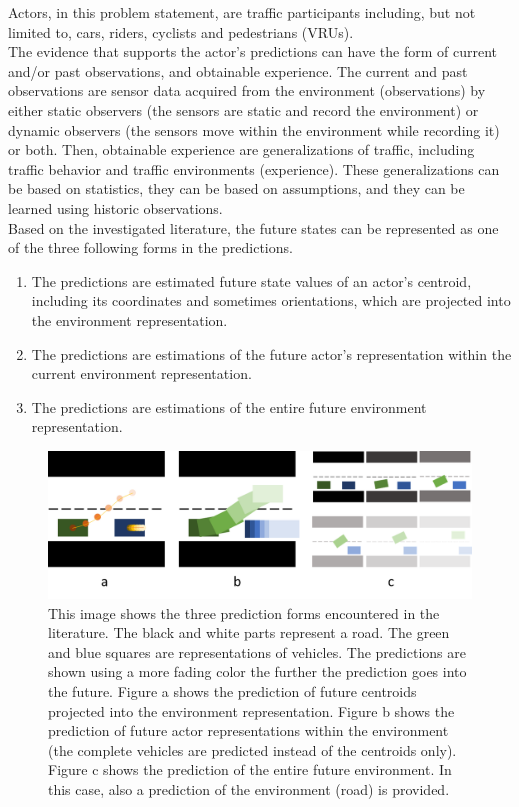 Actors, in this problem statement, are traffic participants including, but not limited to, cars, riders, cyclists and pedestrians (\glspl{VRU}). \\

The evidence that supports the actor's predictions can have the form of current and/or past observations, and obtainable experience. The current and past observations are sensor data acquired from the environment (observations) by either static observers (the sensors are static and record the environment) or dynamic observers (the sensors move within the environment while recording it) or both.
Then, obtainable experience are generalizations of traffic, including traffic behavior and traffic environments (experience). These generalizations can be based on statistics, they can be based on assumptions, and they can be learned using historic observations. \\

Based on the investigated literature, the future states can be represented as one of the three following forms in the predictions. 

\begin{enumerate}
	\item The predictions are estimated future state values of an actor's centroid, including its coordinates and sometimes orientations, which are projected into the environment representation.
	\item The predictions are estimations of the future actor's representation within the current environment representation.
	\item The predictions are estimations of the entire future environment representation.
\end{enumerate}

\begin{figure}[h!]
	\centering
	\includegraphics[width=0.8\linewidth]{Figures/Introduction/Prediction_forms}
	\caption{This image shows the three prediction forms encountered in the literature. The black and white parts represent a road. The green and blue squares are representations of vehicles. The predictions are shown using a more fading color the further the prediction goes into the future. Figure a shows the prediction of future centroids projected into the environment representation. Figure b shows the prediction of future actor representations within the environment (the complete vehicles are predicted instead of the centroids only). Figure c shows the prediction of the entire future environment. In this case, also a prediction of the environment (road) is provided.}  
	\label{fig:pred_froms}
\end{figure}

